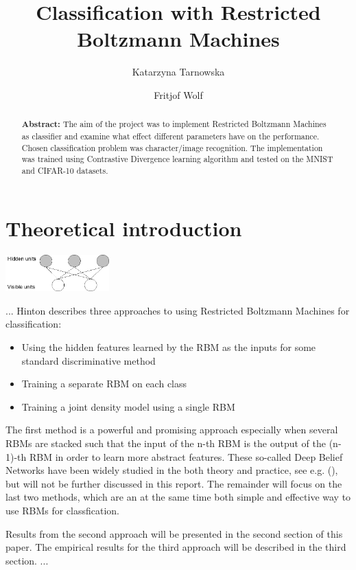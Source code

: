 \documentclass[a4paper]{scrartcl}
\begin{document}
\title{Classification with Restricted Boltzmann Machines}
\author{Katarzyna Tarnowska \and Fritjof Wolf}
\maketitle
\newpage
\begin{abstract}
\textbf{Abstract:}
The aim of the project was to implement Restricted Boltzmann Machines as classifier and examine what effect different parameters have on the performance. Chosen classification problem was character/image recognition. The implementation was trained using Contrastive Divergence learning algorithm and tested on the MNIST and CIFAR-10 datasets. 
\end{abstract}

\section{Theoretical introduction}
\begin{center}
\includegraphics[width=4cm]{images/rbm.png}
\end{center} 
...
Hinton \cite{Hinton} describes three approaches to using Restricted Boltzmann Machines for classification:
\begin{itemize}
    \item Using the hidden features learned by the RBM as the inputs for some standard discriminative method
    \item Training a separate RBM on each class
	\item Training a joint density model using a single RBM
\end{itemize}
The first method is a powerful and promising approach especially when several RBMs are stacked such that the input of the n-th RBM is the output of the (n-1)-th RBM in order to learn more abstract features. These so-called Deep Belief Networks have been widely studied in the both theory and practice, see e.g. (\cite{DeepBelief}), but will not be further discussed in this report. The remainder will focus on the last two methods, which are an at the same time both simple and effective way to use RBMs for classfication. 

Results from the second approach will be presented in the second section of this paper. The empirical results for the third approach will be described in the third section.
...
\end{document}
